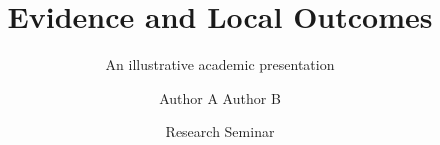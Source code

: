 \title[Evidence and local outcomes]{Evidence and Local Outcomes}
\subtitle{An illustrative academic presentation}
\author[Author A \& B]{\texorpdfstring{Author A \qquad Author B}{Author A and Author B}}
\date[Seminar]{Research Seminar}
